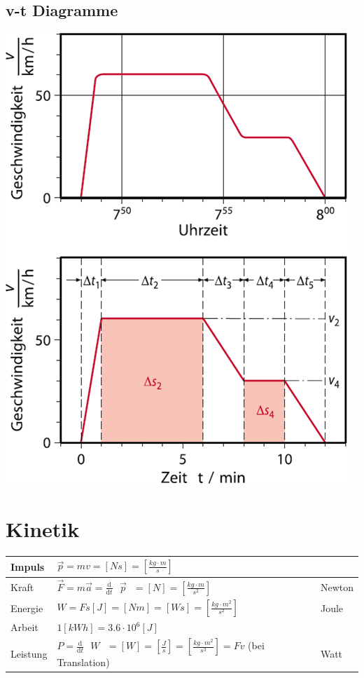 \documentclass[a4paper]{scrartcl}
\newcommand{\abl}[2]{\frac{\text{d}}{\text{d}#2}\text{ } #1 \text{ }}
\begin{document}
\begin{multicols}{2}
		\subsection{v-t Diagramme}
		\includegraphics[width=0.9\linewidth]{img/v-t_diagram}
	\end{multicols}



\section{Kinetik}
	\begin{tabu} {l X l}
		\hline
		Impuls
		&	$\vec{p} = mv = \left[ Ns \right] = \left[ \frac{kg \cdot m}{s} \right]$
		& 
		\\ \hline
		Kraft
		&	$\vec{F}= m\vec{a} = \abl{\vec{p}}{t} = \left[ N \right] = \left[ \frac{kg \cdot m}{s^2} \right]$
		&	Newton
		\\ \hline
		Energie
		&	$W = F s \left[ J \right] = \left[ N m \right] = \left[ Ws \right] = \left[ \frac{kg \cdot m^2}{s^2} \right]$
		&	Joule
		\\
		Arbeit
		&	$1 \left[kWh\right] = 3.6 \cdot 10^6 \left[ J \right]$
		&
		\\ \hline
		Leistung
		&	$P = \abl{W}{t} = \left[ W \right] = \left[ \frac{J}{s} \right] = \left[ \frac{kg \cdot m^2}{s^3} \right] = Fv$ (bei Translation)
		&	Watt
		\\ \hline
	\end{tabu}
	
\end{document}
